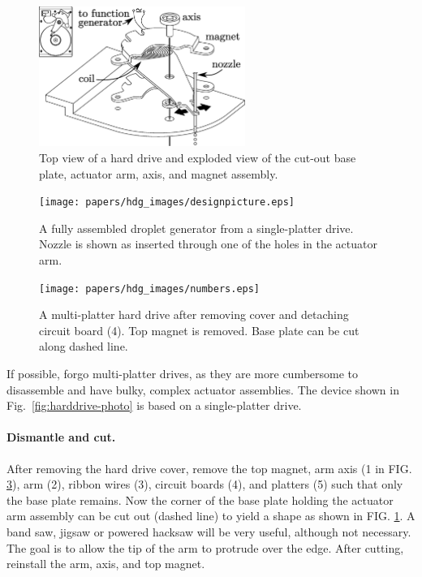 \documentclass[11.5pt,oneside]{book}
\newcommand*{\figref}[1]{Fig.~\ref{#1}}
\begin{document}
\begin{figure}
\centering
\includegraphics[width=0.6\textwidth]{papers/hdg_images/dge.eps}
\caption{Top view of a hard drive and exploded view of the cut-out base
plate, actuator arm, axis, and magnet assembly. \label{fig:designschematic}}
\end{figure}
\begin{figure}
\centering
\texttt{[image: papers/hdg\_images/designpicture.eps]}
\caption{A fully assembled droplet generator from a single-platter drive. Nozzle is shown as inserted
through one of the holes in the actuator arm. \label{fig:photo}}
\end{figure}
\begin{figure}
\centering
\texttt{[image: papers/hdg\_images/numbers.eps]}
\caption{A multi-platter hard drive after removing cover and detaching circuit board (4). Top
        magnet is removed. Base plate can be cut along dashed line. \label{fig:numbers}}
\end{figure}

If possible, forgo multi-platter drives, as they are more cumbersome to disassemble and have
bulky, complex actuator assemblies. The device shown in \figref{fig:harddrive-photo}
is based on a single-platter drive.

\paragraph{Dismantle and cut.} After removing the hard drive cover, remove
the top magnet, arm axis (1 in FIG. \ref{fig:numbers}), arm (2), ribbon wires (3), circuit boards (4), and
platters (5) such that only the base plate remains. Now the corner of the base plate holding
the actuator arm assembly can be cut out (dashed line) to yield a shape as shown in FIG.
\ref{fig:designschematic}. A band saw, jigsaw or powered hacksaw will be very
useful, although not necessary. The goal is to allow the tip of the arm to
protrude over the edge. After cutting, reinstall the arm, axis, and top magnet.
\end{document}
